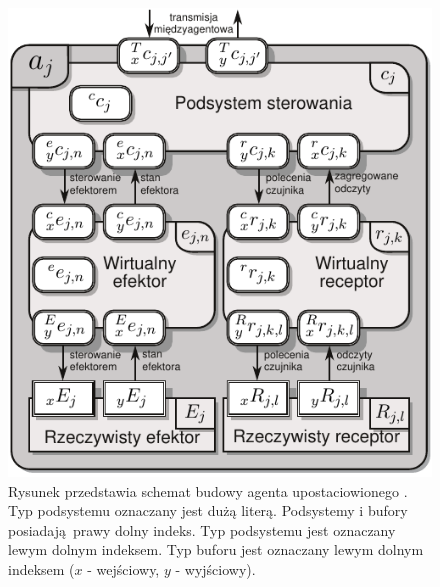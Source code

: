 \begin{figure}
	\centering
	\includegraphics[width=.6\textwidth]{images/agent_structure.pdf}
	\caption{Rysunek przedstawia schemat budowy agenta upostaciowionego \cite{bib:Zielinski:2014_kkr_relacje-twiki}. Typ podsystemu oznaczany jest dużą literą. Podsystemy i bufory posiadają prawy dolny indeks. Typ podsystemu jest oznaczany lewym dolnym indeksem.  Typ buforu jest oznaczany lewym dolnym indeksem ($x$ - wejściowy, $y$ - wyjściowy).}
	\label{fig:upostaciowiony}
\end{figure}